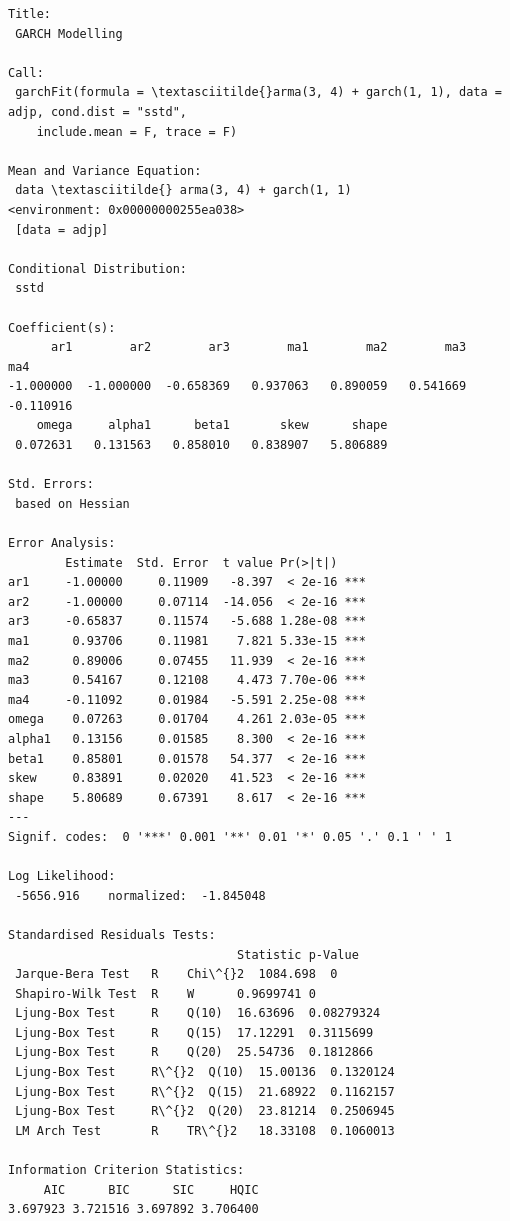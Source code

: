 \documentclass[12pt]{article}
\begin{document}
    \begin{Verbatim}[commandchars=\\\{\}]
Title:
 GARCH Modelling

Call:
 garchFit(formula = \textasciitilde{}arma(3, 4) + garch(1, 1), data = adjp, cond.dist = "sstd",
    include.mean = F, trace = F)

Mean and Variance Equation:
 data \textasciitilde{} arma(3, 4) + garch(1, 1)
<environment: 0x00000000255ea038>
 [data = adjp]

Conditional Distribution:
 sstd

Coefficient(s):
      ar1        ar2        ar3        ma1        ma2        ma3        ma4
-1.000000  -1.000000  -0.658369   0.937063   0.890059   0.541669  -0.110916
    omega     alpha1      beta1       skew      shape
 0.072631   0.131563   0.858010   0.838907   5.806889

Std. Errors:
 based on Hessian

Error Analysis:
        Estimate  Std. Error  t value Pr(>|t|)
ar1     -1.00000     0.11909   -8.397  < 2e-16 ***
ar2     -1.00000     0.07114  -14.056  < 2e-16 ***
ar3     -0.65837     0.11574   -5.688 1.28e-08 ***
ma1      0.93706     0.11981    7.821 5.33e-15 ***
ma2      0.89006     0.07455   11.939  < 2e-16 ***
ma3      0.54167     0.12108    4.473 7.70e-06 ***
ma4     -0.11092     0.01984   -5.591 2.25e-08 ***
omega    0.07263     0.01704    4.261 2.03e-05 ***
alpha1   0.13156     0.01585    8.300  < 2e-16 ***
beta1    0.85801     0.01578   54.377  < 2e-16 ***
skew     0.83891     0.02020   41.523  < 2e-16 ***
shape    5.80689     0.67391    8.617  < 2e-16 ***
---
Signif. codes:  0 '***' 0.001 '**' 0.01 '*' 0.05 '.' 0.1 ' ' 1

Log Likelihood:
 -5656.916    normalized:  -1.845048

Standardised Residuals Tests:
                                Statistic p-Value
 Jarque-Bera Test   R    Chi\^{}2  1084.698  0
 Shapiro-Wilk Test  R    W      0.9699741 0
 Ljung-Box Test     R    Q(10)  16.63696  0.08279324
 Ljung-Box Test     R    Q(15)  17.12291  0.3115699
 Ljung-Box Test     R    Q(20)  25.54736  0.1812866
 Ljung-Box Test     R\^{}2  Q(10)  15.00136  0.1320124
 Ljung-Box Test     R\^{}2  Q(15)  21.68922  0.1162157
 Ljung-Box Test     R\^{}2  Q(20)  23.81214  0.2506945
 LM Arch Test       R    TR\^{}2   18.33108  0.1060013

Information Criterion Statistics:
     AIC      BIC      SIC     HQIC
3.697923 3.721516 3.697892 3.706400
    \end{Verbatim}
\end{document}
